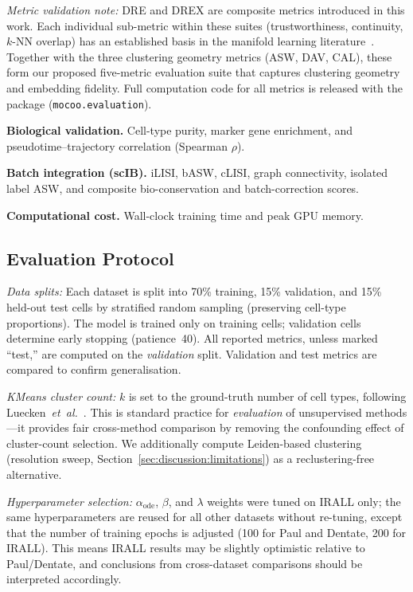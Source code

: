 \documentclass[journal]{IEEEtran}
\begin{document}
\textit{Metric validation note:} DRE and DREX are composite metrics introduced in this work. Each individual sub-metric within these suites (trustworthiness, continuity, $k$-NN overlap) has an established basis in the manifold learning literature~\cite{venna2006local}. Together with the three clustering geometry metrics (ASW, DAV, CAL), these form our proposed five-metric evaluation suite that captures clustering geometry and embedding fidelity. Full computation code for all metrics is released with the package (\texttt{mocoo.evaluation}).

\textbf{Biological validation.} Cell-type purity, marker gene enrichment, and pseudotime--trajectory correlation (Spearman $\rho$).

\textbf{Batch integration (scIB).} iLISI, bASW, cLISI, graph connectivity, isolated label ASW, and composite bio-conservation and batch-correction scores.

\textbf{Computational cost.} Wall-clock training time and peak GPU memory.

\subsection{Evaluation Protocol}
\label{sec:experiments:protocol}

\textit{Data splits:} Each dataset is split into 70\% training, 15\% validation, and 15\% held-out test cells by stratified random sampling (preserving cell-type proportions). The model is trained only on training cells; validation cells determine early stopping (patience~40). All reported metrics, unless marked ``test,'' are computed on the \textit{validation} split. Validation and test metrics are compared to confirm generalisation.

\textit{KMeans cluster count:} $k$ is set to the ground-truth number of cell types, following Luecken~\textit{et~al.}~\cite{luecken2022scib}. This is standard practice for \textit{evaluation} of unsupervised methods---it provides fair cross-method comparison by removing the confounding effect of cluster-count selection. We additionally compute Leiden-based clustering~\cite{traag2019leiden} (resolution sweep, Section~\ref{sec:discussion:limitations}) as a reclustering-free alternative.

\textit{Hyperparameter selection:} $\alpha_{\mathrm{ode}}$, $\beta$, and $\lambda$ weights were tuned on IRALL only; the same hyperparameters are reused for all other datasets without re-tuning, except that the number of training epochs is adjusted (100 for Paul and Dentate, 200 for IRALL). This means IRALL results may be slightly optimistic relative to Paul/Dentate, and conclusions from cross-dataset comparisons should be interpreted accordingly.
\end{document}
